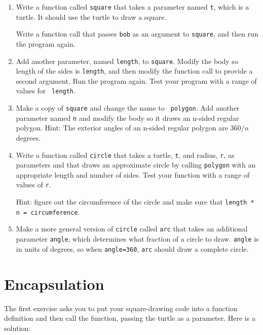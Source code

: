 \documentclass[10pt]{book}
\begin{document}
\begin{enumerate}

\item Write a function called {\tt square} that takes a parameter
named {\tt t}, which is a turtle.  It should use the turtle to draw
a square.

Write a function call that passes {\tt bob} as an argument to
{\tt square}, and then run the program again.

\item Add another parameter, named {\tt length}, to {\tt square}.
Modify the body so length of the sides is {\tt length}, and then
modify the function call to provide a second argument.  Run the
program again.  Test your program with a range of values for {\tt
length}.

\item Make a copy of {\tt square} and change the name to {\tt
  polygon}.  Add another parameter named {\tt n} and modify the body
  so it draws an n-sided regular polygon.  Hint: The exterior angles
  of an n-sided regular polygon are $360/n$ degrees.   

\item Write a function called {\tt circle} that takes a turtle, 
{\tt t}, and radius, {\tt r}, as parameters and that draws an
approximate circle by calling {\tt polygon} with an appropriate
length and number of sides.  Test your function with a range of values
of {\tt r}.   

Hint: figure out the circumference of the circle and make sure that
{\tt length * n = circumference}.

\item Make a more general version of {\tt circle} called {\tt arc}
that takes an additional parameter {\tt angle}, which determines
what fraction of a circle to draw.  {\tt angle} is in units of
degrees, so when {\tt angle=360}, {\tt arc} should draw a complete
circle.

\end{enumerate}


\section{Encapsulation}

The first exercise asks you to put your square-drawing code
into a function definition and then call the function, passing
the turtle as a parameter.  Here is a solution:
\end{document}
